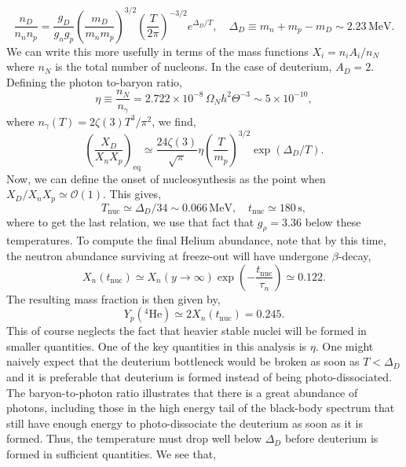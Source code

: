 \documentclass[11pt]{article}
\numberwithin{equation}{section}
\numberwithin{figure}{section}
\numberwithin{table}{section}
\newcommand{\mO}{\mathcal{O}}
\begin{document}
\begin{equation}
\frac{n_D}{n_n n_p} = \frac{g_D}{g_n g_p} \left(\frac{m_D}{m_n m_p}\right)^{3/2} \left(\frac{T}{2\pi}\right)^{-3/2} e^{\Delta_D/T}, \quad \Delta_D \equiv m_n + m_p - m_D \sim 2.23 \, \mathrm{MeV}.
\end{equation}
We can write this more usefully in terms of the mass functions $X_i = n_i A_i/n_N$ where $n_N$ is the total number of nucleons. In the case of deuterium, $A_{D} = 2$. Defining the photon to-baryon ratio,
\begin{equation}
\eta \equiv \frac{n_N}{n_\gamma} = 2.722 \times 10^{-8}\,\Omega_N h^2 \Theta^{-3} \sim 5 \times 10^{-10},
\end{equation}
where $n_\gamma(T) = 2 \zeta(3) T^3 / \pi^2$, we find,
\begin{equation}
\left(\frac{X_D}{X_n X_p}\right)_{\mathrm{eq}} \simeq \frac{24 \zeta(3)}{\sqrt{\pi}} \eta \left(\frac{T}{m_p}\right)^{3/2} \exp(\Delta_D/T).
\end{equation}
Now, we can define the onset of nucleosynthesis as the point when $X_{D}/X_n X_p \simeq \mO(1)$. This gives,
\begin{equation}
T_{\mathrm{nuc}} \simeq \Delta_D / 34 \sim 0.066 \, \mathrm{MeV}, \quad t_{\mathrm{nuc}} \simeq 180 \, \mathrm{s},
\end{equation}
where to get the last relation, we use that fact that $g_{\rho} = 3.36$ below these temperatures. To compute the final Helium abundance, note that by this time, the neutron abundance surviving at freeze-out will have undergone $\beta$-decay,
\begin{equation}
X_n(t_{\mathrm{nuc}}) \simeq X_n(y \rightarrow \infty) \exp\left(- \frac{t_{\mathrm{nuc}}}{\tau_n}\right) \simeq 0.122.
\end{equation}
The resulting mass fraction is then given by,
\begin{equation}
Y_p(^{4}\mathrm{He}) \simeq 2 X_n(t_{\mathrm{nuc}}) = 0.245.
\end{equation}
This of course neglects the fact that heavier stable nuclei will be formed in smaller quantities. One of the key quantities in this analysis is $\eta$. One might naively expect that the deuterium bottleneck would be broken as soon as $T < \Delta_D$ and it is preferable that deuterium is formed instead of being photo-dissociated. The baryon-to-photon ratio illustrates that there is a great abundance of photons, including those in the high energy tail of the black-body spectrum that still have enough energy to photo-dissociate the deuterium as soon as it is formed. Thus, the temperature must drop well below $\Delta_D$ before deuterium is formed in sufficient quantities. We see that,
\end{document}

